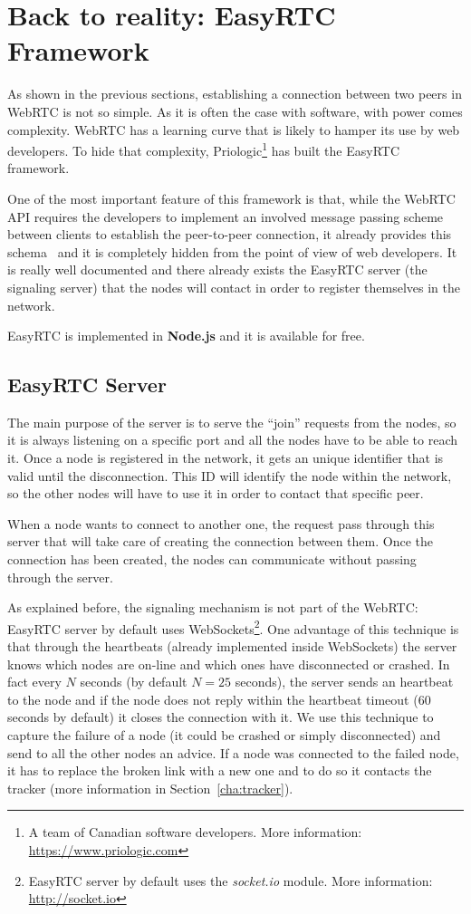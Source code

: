 \section{Back to reality: EasyRTC Framework}
\label{sec:easy_tc}
As shown in the previous sections, establishing a connection between two peers in WebRTC is not so simple.
As it is often the case with software, with power comes complexity. WebRTC has a learning curve that is likely to hamper its use by web developers. To hide that complexity, Priologic\footnote{A team of Canadian software developers. More information: \url{https://www.priologic.com}} has built the EasyRTC framework.

One of the most important feature of this framework is that, while the WebRTC API requires the developers to implement an involved message passing scheme between clients to establish the peer-to-peer connection, it already provides this schema~\cite{easyrtc} and it is completely hidden from the point of view of web developers. It is really well documented and there already exists the EasyRTC server (the signaling server) that the nodes will contact in order to register themselves in the network.

EasyRTC is implemented in \textbf{Node.js} and it is available for free.

\subsection{EasyRTC Server}
\label{subsec:easyrtc_server}

The main purpose of the server is to serve the ``join'' requests from the nodes, so it is always listening on a specific port and all the nodes have to be able to reach it. Once a node is registered in the network, it gets an unique identifier that is valid until the disconnection. This ID will identify the node within the network, so the other nodes will have to use it in order to contact that specific peer. 

When a node wants to connect to another one, the request pass through this server that will take care of creating the connection between them. Once the connection has been created, the nodes can communicate without passing through the server. 

As explained before, the signaling mechanism is not part of the WebRTC: EasyRTC server by default uses WebSockets\footnote{EasyRTC server by default uses the \emph{socket.io} module. More information: \url{http://socket.io}}. One advantage of this technique is that through the heartbeats (already implemented inside WebSockets) the server knows which nodes are on-line and which ones have disconnected or crashed. In fact every $N$ seconds (by default $N=25$ seconds), the server sends an heartbeat to the node and if the node does not reply within the heartbeat timeout (60 seconds by default) it closes the connection with it. We use this technique to capture the failure of a node (it could be crashed or simply disconnected) and send to all the other nodes an advice. If a node was connected to the failed node, it has to replace the broken link with a new one and to do so it contacts the tracker (more information in Section~\ref{cha:tracker}).

